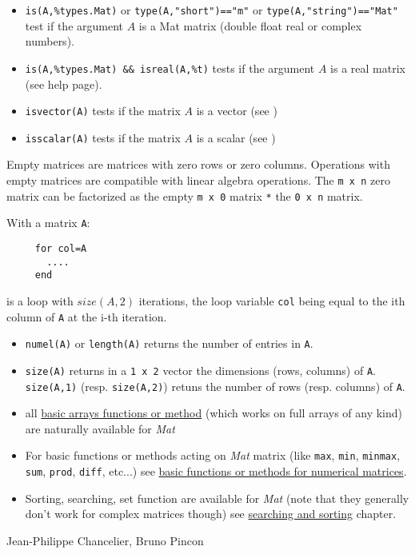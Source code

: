 \begin{itemize}
    \item \verb+is(A,%types.Mat)+ or \verb+type(A,"short")=="m"+ or \verb+type(A,"string")=="Mat"+ 
     test if the argument $A$ is a Mat matrix (double float real or complex numbers).
    \item \verb+is(A,%types.Mat) && isreal(A,%t)+ tests if the argument $A$ is a real matrix (see
                      help page).
    \item \verb+isvector(A)+ tests if the matrix $A$ is a vector (see )
    \item \verb+isscalar(A)+ tests if the matrix $A$ is a scalar (see )
\end{itemize}


Empty matrices are matrices with zero rows or zero columns. Operations with empty matrices
are compatible with linear algebra operations. The \verb+m x n+ zero matrix can be 
factorized as the empty \verb+m x 0+ matrix \verb+*+ the \verb+0 x n+ matrix. 


With a matrix \verb+A+:
\begin{verbatim}
     for col=A
       ....
     end
\end{verbatim} 
is a loop with $size(A,2)$ iterations, the loop 
variable  \verb+col+ being equal to the ith column of \verb+A+ at the i-th iteration.

\begin{itemize}
   \item \verb+numel(A)+ or \verb+length(A)+ returns the number of entries in \verb+A+.
   \item \verb+size(A)+ returns in a \verb+1 x 2+ vector the dimensions (rows, columns)
of \verb+A+. \verb+size(A,1)+ (resp. \verb+size(A,2)+) retuns the number of rows 
(resp. columns) of \verb+A+.
   \item all \hyperlink{arrays}{basic arrays functions or method} (which works on full arrays of any kind) 
     are naturally available for \emph{Mat} 
   \item For basic functions or methods acting on \emph{Mat} matrix (like \verb+max+, \verb+min+, \verb+minmax+,
     \verb+sum+, \verb+prod+, \verb+diff+, etc...) see \hyperlink{basicnumarrays}{basic functions or methods for numerical matrices}.
    \item Sorting, searching, set function are available for \emph{Mat}  (note that they generally don't work for complex matrices
      though) see \hyperlink{searchandsort}{searching and sorting} chapter.
\end{itemize}


\begin{manseealso}

\end{manseealso}

\begin{authors}
   Jean-Philippe Chancelier, Bruno Pincon
\end{authors}
